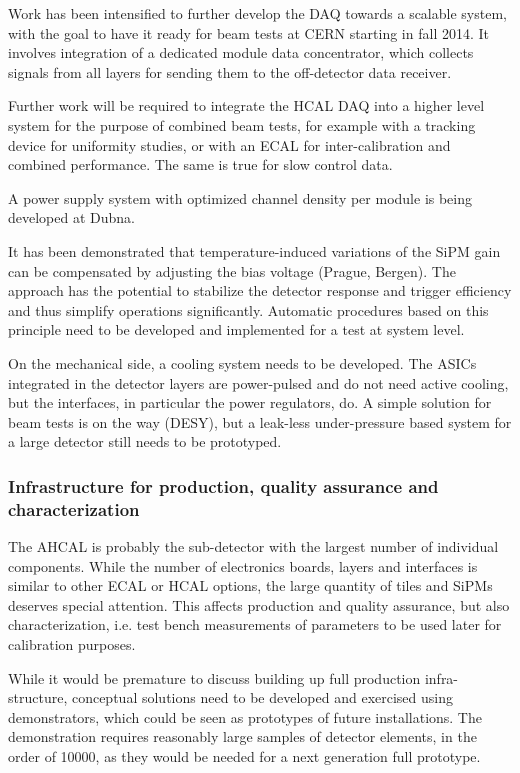 Work has been intensified to further develop the DAQ towards a scalable system, with the goal to have it ready for beam tests at CERN starting in fall 2014. It involves integration of a dedicated module data concentrator, which collects signals from all layers for sending them to the off-detector data receiver.

Further work will be required to integrate the HCAL DAQ into a higher level system for the purpose of combined beam tests, for example with a tracking device for uniformity studies, or with an ECAL for inter-calibration and combined performance. The same is true for slow control data.

A power supply system with optimized channel density per module is being developed at Dubna.

It has been demonstrated that temperature-induced variations of the SiPM gain can be compensated by adjusting the bias voltage (Prague, Bergen). The approach has the potential to stabilize the detector response and trigger efficiency and thus simplify operations significantly. Automatic procedures based on this principle need to be developed and implemented for a test at system level.

On the mechanical side, a cooling system needs to be developed. The ASICs integrated in the detector layers are power-pulsed and do not need active cooling, but the interfaces, in particular the power regulators, do. A simple solution for beam tests is on the way (DESY), but a leak-less under-pressure based system for a large detector still needs to be prototyped.

\subsubsection{Infrastructure for production, quality assurance and characterization}

The AHCAL is probably the sub-detector with the largest number of individual components. While the number of electronics boards, layers and interfaces is similar to other ECAL or HCAL options, the large quantity of tiles and SiPMs deserves special attention. This affects production and quality assurance, but also characterization, i.e. test bench measurements of parameters to be used later for calibration purposes.

While it would be premature to discuss building up full production infra-structure, conceptual solutions need to be developed and exercised using demonstrators, which could be seen as prototypes of future installations. The demonstration requires reasonably large samples of detector elements, in the order of 10000, as they would be needed for a next generation full prototype.

